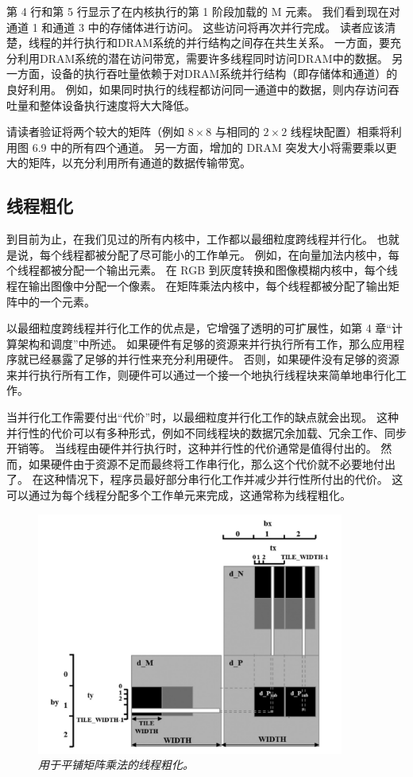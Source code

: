 第 4 行和第 5 行显示了在内核执行的第 1 阶段加载的 M 元素。 我们看到现在对通道 1 和通道 3 中的存储体进行访问。
这些访问将再次并行完成。 读者应该清楚，线程的并行执行和DRAM系统的并行结构之间存在共生关系。 
一方面，要充分利用DRAM系统的潜在访问带宽，需要许多线程同时访问DRAM中的数据。 
另一方面，设备的执行吞吐量依赖于对DRAM系统并行结构（即存储体和通道）的良好利用。 
例如，如果同时执行的线程都访问同一通道中的数据，则内存访问吞吐量和整体设备执行速度将大大降低。

请读者验证将两个较大的矩阵（例如 $8 \times 8$ 与相同的 $2 \times 2$ 线程块配置）相乘将利用图 6.9 中的所有四个通道。 
另一方面，增加的 DRAM 突发大小将需要乘以更大的矩阵，以充分利用所有通道的数据传输带宽。

\subsection{线程粗化}
到目前为止，在我们见过的所有内核中，工作都以最细粒度跨线程并行化。 也就是说，每个线程都被分配了尽可能小的工作单元。 
例如，在向量加法内核中，每个线程都被分配一个输出元素。 
在 RGB 到灰度转换和图像模糊内核中，每个线程在输出图像中分配一个像素。 
在矩阵乘法内核中，每个线程都被分配了输出矩阵中的一个元素。

以最细粒度跨线程并行化工作的优点是，它增强了透明的可扩展性，如第 4 章“计算架构和调度”中所述。 
如果硬件有足够的资源来并行执行所有工作，那么应用程序就已经暴露了足够的并行性来充分利用硬件。 
否则，如果硬件没有足够的资源来并行执行所有工作，则硬件可以通过一个接一个地执行线程块来简单地串行化工作。

当并行化工作需要付出“代价”时，以最细粒度并行化工作的缺点就会出现。 
这种并行性的代价可以有多种形式，例如不同线程块的数据冗余加载、冗余工作、同步开销等。 
当线程由硬件并行执行时，这种并行性的代价通常是值得付出的。 
然而，如果硬件由于资源不足而最终将工作串行化，那么这个代价就不必要地付出了。 
在这种情况下，程序员最好部分串行化工作并减少并行性所付出的代价。 
这可以通过为每个线程分配多个工作单元来完成，这通常称为线程粗化。

\begin{figure}[H]
	\centering
	\includegraphics[width=0.9\textwidth]{figs/F6.12.png}
	\caption{\textit{用于平铺矩阵乘法的线程粗化。}}
\end{figure}

